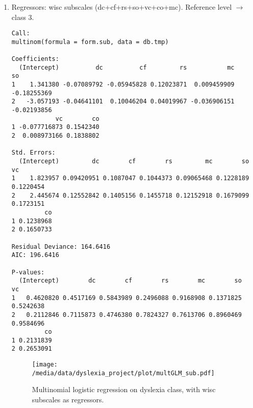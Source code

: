 \documentclass[11pt, a4paper, twoside, openright]{article}
\begin{document}
\begin{enumerate}
\clearpage

\item Regressors: wisc subscales
  (dc+cf+rs+so+vc+co+mc). Reference level $\longrightarrow$ class $3$.
\begin{verbatim}
Call:
multinom(formula = form.sub, data = db.tmp)

Coefficients:
  (Intercept)          dc          cf         rs           mc          so
1    1.341380 -0.07089792 -0.05945828 0.12023871  0.009459909 -0.18255369
2   -3.057193 -0.04641101  0.10046204 0.04019967 -0.036906151 -0.02193856
            vc        co
1 -0.077716873 0.1542340
2  0.008973166 0.1838802

Std. Errors:
  (Intercept)         dc        cf        rs         mc        so        vc
1    1.823957 0.09420951 0.1087047 0.1044373 0.09065468 0.1228189 0.1220454
2    2.445674 0.12552842 0.1405156 0.1455718 0.12152918 0.1679099 0.1723151
         co
1 0.1238968
2 0.1650733

Residual Deviance: 164.6416 
AIC: 196.6416 

P-values:
  (Intercept)        dc        cf        rs        mc        so        vc
1   0.4620820 0.4517169 0.5843989 0.2496088 0.9168908 0.1371825 0.5242638
2   0.2112846 0.7115873 0.4746380 0.7824327 0.7613706 0.8960469 0.9584696
         co
1 0.2131839
2 0.2653091
\end{verbatim}

\begin{figure}[h!] 
\centering
\texttt{[image: /media/data/dyslexia\_project/plot/multGLM\_sub.pdf]}
\caption{Multinomial logistic regression on dyslexia class, with
  wisc subscales as regressors.}
\label{fig:20}
\end{figure}
\end{enumerate}

\clearpage
\end{document}
